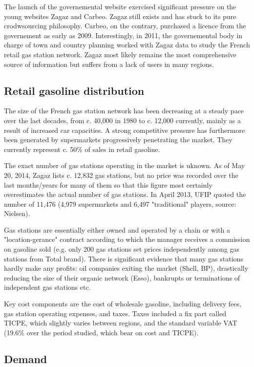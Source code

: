 \documentclass[11pt]{article}
\begin{document}
The launch of the governemental website exercised significant pressure on the young websites Zagaz and Carbeo. Zagaz still exists and has stuck to its pure crodwsourcing philosophy. Carbeo, on the contrary, purchased a licence from the governement as early as 2009. Interestingly, in 2011, the governemental body in charge of town and country planning worked with Zagaz data to study the French retail gas station network. Zagaz most likely remains the most comprehensive source of information but suffers from a lack of users in many regions.

\subsection{Retail gasoline distribution}

The size of the French gas station network has been decreasing at a steady pace over the last decades, from c. 40,000 in 1980 to c. 12,000 currently, mainly as a result of increased car capacities.  A strong competitive pressure has furthermore been generated by supermarkets progressively penetrating the market. They currently represent c. 50\% of sales in retail gasoline.

The exact number of gas stations operating in the market is uknown. As of May 20, 2014, Zagaz lists c. 12,832 gas stations, but no price was recorded over the last months/years for many of them so that this figure most certainly overestimates the actual number of gas stations. In April 2013, UFIP quoted the number of 11,476 (4,979 supermarkets and 6,497 "traditional" players, source: Nielsen).

Gas stations are essentially either owned and operated by a chain or with a "location-gerance" contract according to which the manager receives a commission on gasoline sold (e.g. only 200 gas stations set prices independently among gas stations from Total brand). There is significant evidence that many gas stations hardly make any profits: oil companies exiting the market (Shell, BP), drastically reducing the size of their organic network (Esso), bankrupts or terminations of independent gas stations etc.

Key cost components are the cost of wholesale gasoline, including delivery fees,  gas station operating expenses, and taxes. Taxes included a fix part called TICPE, which slightly varies between regions, and the standard variable VAT (19.6\% over the period studied, which bear on cost and TICPE).
 
\subsection{Demand}
\end{document}
